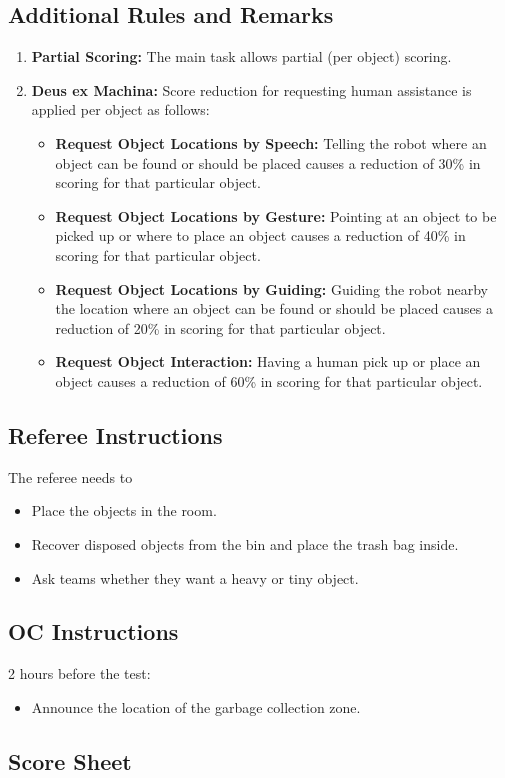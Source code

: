 \subsection*{Additional Rules and Remarks}
\begin{enumerate}[nosep]
	\item \textbf{Partial Scoring:} The main task allows partial (per object) scoring.
	
	\item \textbf{Deus ex Machina:} Score reduction for requesting human assistance is applied per object as follows:
	\begin{itemize}[nosep]
		\item \textbf{Request Object Locations by Speech:} Telling the robot where an object can be found or should be placed causes a reduction of 30\% in scoring for that particular object.
		
		\item \textbf{Request Object Locations by Gesture:} Pointing at an object to be picked up or where to place an object causes a reduction of 40\% in scoring for that particular object.
		
		\item \textbf{Request Object Locations by Guiding:} Guiding the robot nearby the location where an object can be found or should be placed causes a reduction of 20\% in scoring for that particular object.
		
		\item \textbf{Request Object Interaction:} Having a human pick up or place an object causes a reduction of 60\% in scoring for that particular object.
	\end{itemize}
\end{enumerate}

\subsection*{Referee Instructions}
The referee needs to
\begin{itemize}
	\item Place the objects in the room.
	\item Recover disposed objects from the bin and place the trash bag inside.
	\item Ask teams whether they want a heavy or tiny object.
\end{itemize}

\subsection*{OC Instructions}
2 hours before the test:
\begin{itemize}
	\item Announce the location of the garbage collection zone.
\end{itemize}

\subsection*{Score Sheet}

